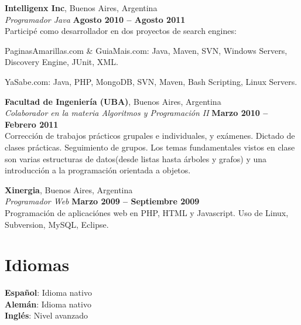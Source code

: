 \documentclass[margin,line]{resume}
\begin{document}
\begin{resume}
    \textbf{Intelligenx Inc}, Buenos Aires, Argentina \vspace{2mm}\\\vspace{1mm}%
    \textsl{Programador Java} \hfill \textbf{Agosto 2010 -- Agosto 2011}\\
	Participé como desarrollador en dos proyectos de search engines:
    \begin{list2}
        \item PaginasAmarillas.com \& GuiaMais.com: Java, Maven, SVN, Windows Servers, Discovery Engine, JUnit, XML.
        \item YaSabe.com: Java, PHP, MongoDB, SVN, Maven, Bash Scripting, Linux Servers. 
    \end{list2}\vspace{-1.5mm}	

    \textbf{Facultad de Ingeniería (UBA)}, Buenos Aires, Argentina \vspace{2mm}\\\vspace{1mm}%
    \textsl{Colaborador en la materia Algoritmos y Programación II} \hfill \textbf{Marzo 2010 -- Febrero 2011}\vspace{1.5mm}\\\vspace{0mm}%
	Corrección de trabajos prácticos grupales e individuales, y exámenes. Dictado de clases prácticas. Seguimiento de grupos. Los temas fundamentales vistos en clase son varias estructuras de datos(desde listas hasta árboles y grafos) y una introducción a la programación orientada a objetos.

    \textbf{Xinergia}, Buenos Aires, Argentina \vspace{2mm}\\\vspace{1mm}%
    \textsl{Programador Web} \hfill \textbf{Marzo 2009 -- Septiembre 2009}\\
	Programación de aplicaciónes web en PHP, HTML y Javascript. Uso de Linux, Subversion, MySQL, Eclipse.
    \section{\mysidestyle Idiomas} 

	\textbf{Español}: Idioma nativo	 \\
	\textbf{Alemán}: Idioma nativo   \\
	\textbf{Inglés}: Nivel avanzado \\



\end{resume}
\end{document}
